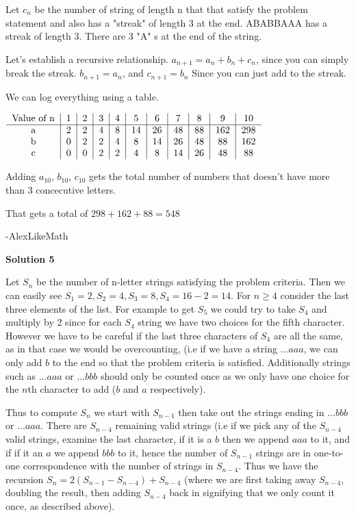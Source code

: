 \begin{enumerate}
 Let $c_n$ be the number of string of length n that that satisfy the problem statement and also has a "streak" of length 3 at the end. ABABBAAA has a streak of length 3. There are 3 "A" s at the end of the string.

 Let's establish a recursive relationship. $a_{n+1} = a_n+b_n+c_n$, since you can simply break the streak. $b_{n+1} = a_n$, and $c_{n+1} = b_n$ Since you can just add to the streak.

 We can log everything using a table.

 $\begin{tabular}{c|c|c|c|c|c|c|c|c|c|c}Value of n & 1 & 2 & 3 & 4 & 5 & 6 & 7 & 8 & 9 & 10\\\hline a & 2 & 2 & 4 & 8 & 14 & 26 & 48 & 88 & 162 & 298\\b & 0 & 2 & 2 & 4 & 8 & 14 & 26 & 48 & 88 & 162 \\c & 0 & 0 & 2 & 2 &4 & 8 & 14 & 26 & 48 & 88\end{tabular}$

 Adding $a_{10}$, $b_{10}$, $c_{10}$ gets the total number of numbers that doesn't have more than 3 concecutive letters.

 That gets a total of $298+162+88 = \boxed{548}$

 -AlexLikeMath

 



\textbf{Solution 5}

Let $S_n$ be the number of n-letter strings satisfying the problem criteria. Then we can easily see $S_1 = 2, S_2 = 4, S_3 = 8, S_4 = 16-2 =14$. For $n \ge 4$ consider the last three elements of the list. For example to get $S_5$ we could try to take $S_4$ and multiply by 2 since for each $S_4$ string we have two choices for the fifth character. However we have to be careful if the last three characters of $S_4$ are all the same, as in that case we would be overcounting, (i.e if we have a string $\dots aaa$, we can only add $b$ to the end so that the problem criteria is satisfied. Additionally strings such as $\dots aaa$ or $\dots bbb$ should only be counted once as we only have one choice for the $n$th character to add ($b$ and $a$ respectively). 

 Thus to compute $S_n$ we start with $S_{n-1}$ then take out the strings ending in $\dots bbb$ or $\dots aaa$. There are $S_{n-4}$ remaining valid strings (i.e if we pick any of the $S_{n-4}$ valid strings, examine the last character, if it is a $b$ then we append $aaa$ to it, and if if it an $a$ we append $bbb$ to it, hence the number of $S_{n-1}$ strings are in one-to-one correspondence with the number of strings in $S_{n-4}$. Thus we have the recursion $S_n = 2(S_{n-1} - S_{n-4}) + S_{n-4}$ (where we are first taking away $S_{n-4}$, doubling the result, then adding $S_{n-4}$ back in signifying that we only count it once, as described above). 


\end{enumerate}
